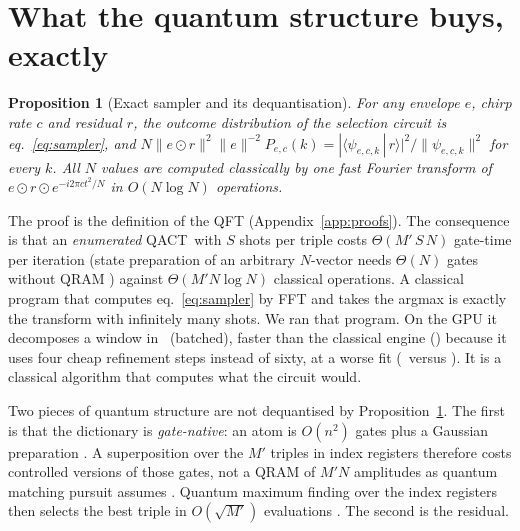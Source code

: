 \documentclass{article}
\newtheorem{proposition}{Proposition}
\newcommand{\qact}{QACT}
\newcommand{\braket}[2]{\langle #1\,|\,#2\rangle}
\newcommand{\norm}[1]{\lVert #1\rVert}
\begin{document}
\section{What the quantum structure buys, exactly}
\label{sec:theory}
\begin{proposition}[Exact sampler and its dequantisation]
\label{prop:dequant}
For any envelope $e$, chirp rate $c$ and residual $r$, the outcome distribution of the selection circuit is eq.~\eqref{eq:sampler}, and $N\norm{e\odot r}^2\norm{e}^{-2}P_{e,c}(k)=|\braket{\psi_{e,c,k}}{r}|^2/\norm{\psi_{e,c,k}}^2$ for every $k$. All $N$ values are computed classically by one fast Fourier transform of $e\odot r\odot e^{-i2\pi ct^2/N}$ in $O(N\log N)$ operations.
\end{proposition}
The proof is the definition of the QFT (Appendix~\ref{app:proofs}). The consequence is that an \emph{enumerated} \qact\ with $S$ shots per triple costs $\Theta(M'\,S\,N)$ gate-time per iteration (state preparation of an arbitrary $N$-vector needs $\Theta(N)$ gates without QRAM \citep{mottonen2005transformation,shende2006synthesis}) against $\Theta(M'N\log N)$ classical operations. A classical program that computes eq.~\eqref{eq:sampler} by FFT and takes the argmax is exactly the transform with infinitely many shots. We ran that program. On the GPU it decomposes a window in \speedQSimBatched\ (batched), faster than the classical engine (\speedClGPUBatched) because it uses four cheap refinement steps instead of sixty, at a worse fit (\speedQSimErr\ versus \speedClGPUErr). It is a classical algorithm that computes what the circuit would.

Two pieces of quantum structure are not dequantised by Proposition~\ref{prop:dequant}. The first is that the dictionary is \emph{gate-native}: an atom is $O(n^2)$ gates plus a Gaussian preparation \citep{grover2002creating}. A superposition over the $M'$ triples in index registers therefore costs controlled versions of those gates, not a QRAM of $M'N$ amplitudes as quantum matching pursuit assumes \citep{bellante2022qmp,jaques2025qram}. Quantum maximum finding over the index registers then selects the best triple in $O(\sqrt{M'})$ evaluations \citep{durr1996minimum,brassard2002amplitude}. The second is the residual.
\end{document}

